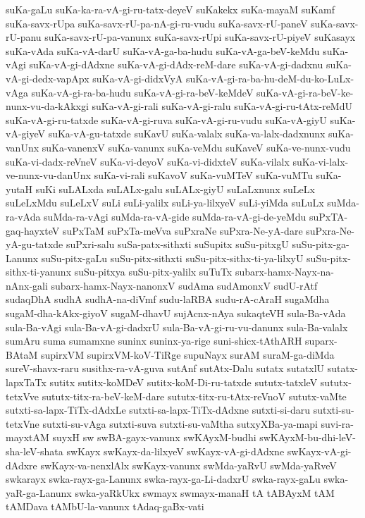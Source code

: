 {suKa-gaLu
suKa-ka-ra-vA-gi-ru-tatx-deyeV
suKakekx
suKa-mayaM
suKamf
suKa-savx-rUpa
suKa-savx-rU-pa-nA-gi-ru-vudu
suKa-savx-rU-paneV
suKa-savx-rU-panu
suKa-savx-rU-pa-vanunx
suKa-savx-rUpi
suKa-savx-rU-piyeV
suKasayx
suKa-vAda
suKa-vA-darU
suKa-vA-ga-ba-hudu
suKa-vA-ga-beV-keMdu
suKa-vAgi
suKa-vA-gi-dAdxne
suKa-vA-gi-dAdx-reM-dare
suKa-vA-gi-dadxnu
suKa-vA-gi-dedx-vapApx
suKa-vA-gi-didxVyA
suKa-vA-gi-ra-ba-hu-deM-du-ko-LuLx-vAga
suKa-vA-gi-ra-ba-hudu
suKa-vA-gi-ra-beV-keMdeV
suKa-vA-gi-ra-beV-ke-nunx-vu-da-kAkxgi
suKa-vA-gi-rali
suKa-vA-gi-ralu
suKa-vA-gi-ru-tAtx-reMdU
suKa-vA-gi-ru-tatxde
suKa-vA-gi-ruva
suKa-vA-gi-ru-vudu
suKa-vA-giyU
suKa-vA-giyeV
suKa-vA-gu-tatxde
suKavU
suKa-valalx
suKa-va-lalx-dadxnunx
suKa-vanUnx
suKa-vanenxV
suKa-vanunx
suKa-veMdu
suKaveV
suKa-ve-nunx-vudu
suKa-vi-dadx-reVneV
suKa-vi-deyoV
suKa-vi-didxteV
suKa-vilalx
suKa-vi-lalx-ve-nunx-vu-danUnx
suKa-vi-rali
suKavoV
suKa-vuMTeV
suKa-vuMTu
suKa-yutaH
suKi
suLALxda
suLALx-galu
suLALx-giyU
suLaLxnunx
suLeLx
suLeLxMdu
suLeLxV
suLi
suLi-yalilx
suLi-ya-lilxyeV
suLi-yiMda
suLuLx
suMda-ra-vAda
suMda-ra-vAgi
suMda-ra-vA-gide
suMda-ra-vA-gi-de-yeMdu
suPxTA-gaq-hayxteV
suPxTaM
suPxTa-meVva
suPxraNe
suPxra-Ne-yA-dare
suPxra-Ne-yA-gu-tatxde
suPxri-salu
suSa-patx-sithxti
suSupitx
suSu-pitxgU
suSu-pitx-ga-Lanunx
suSu-pitx-gaLu
suSu-pitx-sithxti
suSu-pitx-sithx-ti-ya-lilxyU
suSu-pitx-sithx-ti-yanunx
suSu-pitxya
suSu-pitx-yalilx
suTuTx
subarx-hamx-Nayx-na-nAnx-gali
subarx-hamx-Nayx-nanonxV
sudAma
sudAmonxV
sudU-rAtf
sudaqDhA
sudhA
sudhA-na-diVmf
sudu-laRBA
sudu-rA-cAraH
sugaMdha
sugaM-dha-kAkx-giyoV
sugaM-dhavU
sujAcnx-nAya
sukaqteVH
sula-Ba-vAda
sula-Ba-vAgi
sula-Ba-vA-gi-dadxrU
sula-Ba-vA-gi-ru-vu-danunx
sula-Ba-valalx
sumAru
suma
sumamxne
suninx
suninx-ya-rige
suni-shicx-tAthARH
suparx-BAtaM
supirxVM
supirxVM-koV-TiRge
supuNayx
surAM
suraM-ga-diMda
sureV-shavx-raru
susithx-ra-vA-guva
sutAnf
sutAtx-Dalu
sutatx
sutatxlU
sutatx-lapxTaTx
sutitx
sutitx-koMDeV
sutitx-koM-Di-ru-tatxde
sututx-tatxleV
sututx-tetxVve
sututx-titx-ra-beV-keM-dare
sututx-titx-ru-tAtx-reVnoV
sututx-vaMte
sutxti-sa-lapx-TiTx-dAdxLe
sutxti-sa-lapx-TiTx-dAdxne
sutxti-si-daru
sutxti-su-tetxVne
sutxti-su-vAga
sutxti-suva
sutxti-su-vaMtha
sutxyXBa-ya-mapi
suvi-ra-mayxtAM
suyxH
sw
swBA-gayx-vanunx
swKAyxM-budhi
swKAyxM-bu-dhi-leV-sha-leV-shata
swKayx
swKayx-da-lilxyeV
swKayx-vA-gi-dAdxne
swKayx-vA-gi-dAdxre
swKayx-va-nenxlAlx
swKayx-vanunx
swMda-yaRvU
swMda-yaRveV
swkarayx
swka-rayx-ga-Lanunx
swka-rayx-ga-Li-dadxrU
swka-rayx-gaLu
swka-yaR-ga-Lanunx
swka-yaRkUkx
swmayx
swmayx-manaH
tA
tABAyxM
tAM
tAMDava
tAMbU-la-vanunx
tAdaq-gaBx-vati
}
